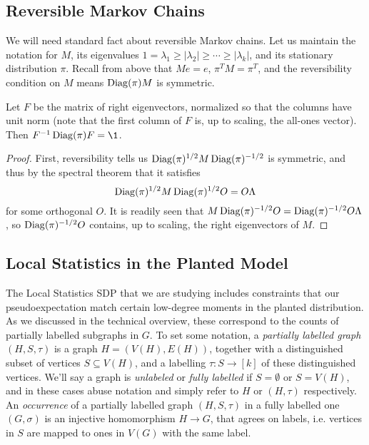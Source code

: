 \subsection{Reversible Markov Chains}

We will need standard fact about reversible Markov chains. Let us maintain the notation for $M$, its eigenvalues $1 = \lambda_1 \ge |\lambda_2| \ge \cdots \ge |\lambda_k|$, and its stationary distribution $\pi$. Recall from above that $Me = e$, $\pi^T M = \pi^T$, and the reversibility condition on $M$ means $\operatorname{Diag}(\pi)M$ is symmetric. 

\begin{lemma}
    Let $F$ be the matrix of right eigenvectors, normalized so that the columns have unit norm (note that the first column of $F$ is, up to scaling, the all-ones vector). Then $F^{-1}\Diag(\pi) F = \1$.
\end{lemma}

\begin{proof}
    First, reversibility tells us $\operatorname{Diag}(\pi)^{1/2}M\operatorname{Diag}(\pi)^{-1/2}$ is symmetric, and thus by the spectral theorem that it satisfies 
    $$
        \operatorname{Diag}(\pi)^{1/2}M\operatorname{Diag}(\pi)^{1/2}O = O\Lambda
    $$ 
    for some orthogonal $O$. It is readily seen that $M\operatorname{Diag}(\pi)^{-1/2}O = \operatorname{Diag}(\pi)^{-1/2}O\Lambda$, so $\operatorname{Diag}(\pi)^{-1/2}O$ contains, up to scaling, the right eigenvectors of $M$.
\end{proof}

\subsection{Local Statistics in the Planted Model} %
\label{sub:local_statistics_in_the_planted_model}

The Local Statistics SDP that we are studying includes constraints that our pseudoexpectation match certain low-degree moments in the planted distribution. As we discussed in the technical overview, these correspond to the counts of partially labelled subgraphs in $G$. To set some notation, a \textit{partially labelled graph} $(H,S,\tau)$ is a graph $H = (V(H),E(H))$, together with a distinguished subset of vertices $S \subseteq V(H)$, and a labelling $\tau : S \to [k]$ of these distinguished vertices. We'll say a graph is \emph{unlabeled} or \textit{fully labelled} if $S = \emptyset$ or $S = V(H)$, and in these cases abuse notation and simply refer to $H$ or $(H,\tau)$ respectively. An \textit{occurrence} of a partially labelled graph $(H,S,\tau)$ in a fully labelled one $(G,\sigma)$ is an injective homomorphism $H \to G$, that agrees on labels, i.e. vertices in $S$ are mapped to ones in $V(G)$ with the same label.

